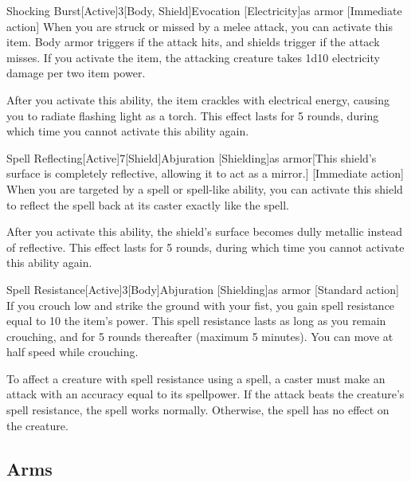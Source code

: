 \begin{magicitemdef}{Shocking Burst}[Active]{3}[Body, Shield]{Evocation [Electricity]}{as armor}
    [Immediate action] When you are struck or missed by a melee attack, you can activate this item.
    Body armor triggers if the attack hits, and shields trigger if the attack misses.
    If you activate the item, the attacking creature takes 1d10 electricity damage per two item power.

    After you activate this ability, the item crackles with electrical energy, causing you to radiate flashing light as a torch.
    This effect lasts for 5 rounds, during which time you cannot activate this ability again.
\end{magicitemdef}

\begin{magicitemdef}{Spell Reflecting}[Active]{7}[Shield]{Abjuration [Shielding]}{as armor}[This shield's surface is completely reflective, allowing it to act as a mirror.]
    [Immediate action] When you are targeted by a spell or spell-like ability, you can activate this shield to reflect the spell back at its caster exactly like the  spell.

    After you activate this ability, the shield's surface becomes dully metallic instead of reflective.
    This effect lasts for 5 rounds, during which time you cannot activate this ability again.
\end{magicitemdef}

\begin{magicitemdef}{Spell Resistance}[Active]{3}[Body]{Abjuration [Shielding]}{as armor}
    [Standard action] If you crouch low and strike the ground with your fist, you gain spell resistance equal to 10 \add the item's power.
    This spell resistance lasts as long as you remain crouching, and for 5 rounds thereafter (maximum 5 minutes).
    You can move at half speed while crouching.

    To affect a creature with spell resistance using a spell, a caster must make an attack with an accuracy equal to its spellpower.
    If the attack beats the creature's spell resistance, the spell works normally.
    Otherwise, the spell has no effect on the creature.
\end{magicitemdef}

\subsection{Arms}

